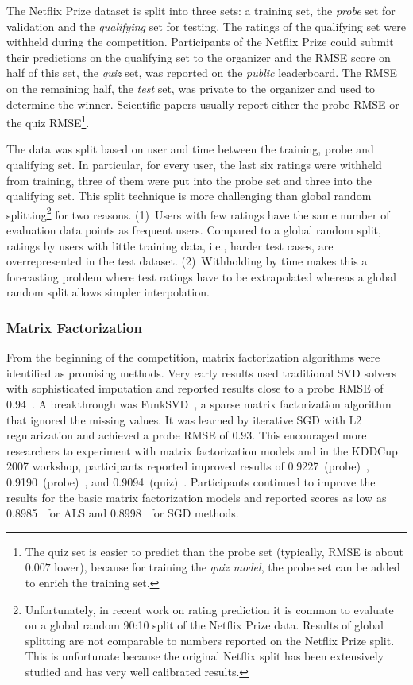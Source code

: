 \documentclass{article}
\newcommand\rmseNFtestpatarek{0.9094}
\newcommand\rmseNFtestZhou{0.8985}
\newcommand\rmseNFprobeGravity{0.9190}
\newcommand\rmseNFtestYehuda{0.8998}
\newcommand\rmseNFprobeKurucz{0.94}
\newcommand\rmseNFprobeLimMAP{0.9227}
\begin{document}
The Netflix Prize dataset is split into three sets: a training set, the \emph{probe} set for validation and the \emph{qualifying} set for testing.
The ratings of the qualifying set were withheld during the competition.
Participants of the Netflix Prize could submit their predictions on the qualifying set to the organizer and the RMSE score on half of this set, the \emph{quiz} set, was reported on the \emph{public} leaderboard.
The RMSE on the remaining half, the \emph{test} set, was private to the organizer and used to determine the winner.
Scientific papers usually report either the probe RMSE or the quiz RMSE\footnote{The quiz set is easier to predict than the probe set (typically, RMSE is about $0.007$ lower), because for training the \emph{quiz model}, the probe set can be added to enrich the training set.}.

The data was split based on user and time between the training, probe and qualifying set.
In particular, for every user, the last six ratings were withheld from training, three of them were put into the probe set and three into the qualifying set.
This split technique is more challenging than global random splitting\footnote{Unfortunately, in recent work on rating prediction it is common to evaluate on a global random 90:10 split of the Netflix Prize data.
Results of global splitting are not comparable to numbers reported on the Netflix Prize split.
This is unfortunate because the original Netflix split has been extensively studied and has very well calibrated results.} for two reasons.
(1)~Users with few ratings have the same number of evaluation data points as frequent users.
Compared to a global random split, ratings by users with little training data, i.e., harder test cases, are overrepresented in the test dataset.
(2)~Withholding by time makes this a forecasting problem where test ratings have to be extrapolated whereas a global random split allows simpler interpolation.





\subsubsection{Matrix Factorization}


From the beginning of the competition, matrix factorization algorithms were identified as promising methods.
Very early results used traditional SVD solvers with sophisticated imputation and reported results close to a probe RMSE of \rmseNFprobeKurucz~\cite{kurucz:kddcup07}.
A breakthrough was FunkSVD~\cite{funksvd}, a sparse matrix factorization algorithm that ignored the missing values.
It was learned by iterative SGD with L2 regularization and achieved a probe RMSE of $0.93$.
This encouraged more researchers to experiment with matrix factorization models and in the KDDCup 2007 workshop, participants reported improved results of \rmseNFprobeLimMAP~(probe)~\cite{lim:kddcup07}, \rmseNFprobeGravity~(probe)~\cite{paterek:kddcup07}, and \rmseNFtestpatarek~(quiz)~\cite{paterek:kddcup07}.
Participants continued to improve the results for the basic matrix factorization models and reported scores as low as \rmseNFtestZhou~\cite{zhou:aaim08} for ALS and \rmseNFtestYehuda~\cite{koren:grandprize} for SGD methods.
\end{document}
